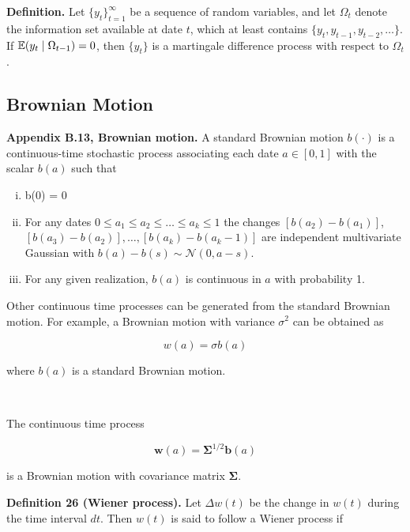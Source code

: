 \textbf{Definition.} Let \(\{y_t\}_{t=1}^\infty \) be a sequence of random variables, and let \(\Omega_t\) denote the information set available at date \(t\), which at least contains \(\{y_t, y_{t-1}, y_{t-2}, \ldots \}\). If \(\E(y_t \mid \Omega_{t-1}) =0\), then \(\{y_t\}\) is a martingale difference process with respect to \(\Omega_t\).

\subsection{Brownian Motion}

%
\textbf{Appendix B.13, Brownian motion.} A standard Brownian motion \(b(\cdot)\) is a continuous-time stochastic process associating each date \(a \in [0, 1]\) with the scalar \(b(a)\) such that

\begin{enumerate}[(i)]

\item b(0) = 0

\item For any dates \(0 \leq a_1 \leq a_2 \leq \ldots \leq a_k \leq 1\) the changes \([b(a_2) - b(a_1)]\), \([b(a_3) - b(a_2)], \ldots, [b(a_k) - b(a_k - 1)]\) are independent multivariate Gaussian with \(b(a) - b(s) \sim \mathcal{N}(0, a -s)\). 

\item For any given realization, \(b(a)\) is continuous in \(a\) with probability 1.

\end{enumerate}

Other continuous time processes can be generated from the standard Brownian motion. For example, a Brownian motion with variance \(\sigma^2\) can be obtained as

\[
w(a) = \sigma b(a)
\]

where \(b(a)\) is a standard Brownian motion.

\

The continuous time process

\[
\boldsymbol{w}(a) = \boldsymbol{\Sigma}^{1/2} \boldsymbol{b}(a)
\]

is a Brownian motion with covariance matrix \(\boldsymbol{\Sigma}\).

\textbf{Definition 26 (Wiener process).} Let \(\Delta w(t)\) be the change in \(w(t)\) during the time interval \(dt\). Then \(w(t)\) is said to follow a Wiener process if

